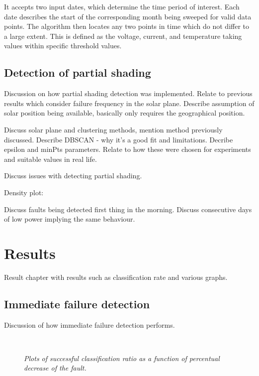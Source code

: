 It accepts two input dates, which determine the time period of interest.
Each date describes the start of the corresponding month being sweeped for valid data points.
The algorithm then locates any two points in time which do not differ to a large extent.
This is defined as the voltage, current, and temperature taking values within specific threshold values.

\section{Detection of partial shading}
Discussion on how partial shading detection was implemented.
Relate to previous results which consider failure frequency in the solar plane.
Describe assumption of solar position being available, basically only requires the geographical position.

Discuss solar plane and clustering methods, mention method previously discussed.
Describe DBSCAN - why it's a good fit and limitations.
Decribe epsilon and minPts parameters.
Relate to how these were chosen for experiments and suitable values in real life.

Discuss issues with detecting partial shading.

Density plot:

Discuss faults being detected first thing in the morning.
Discuss consecutive days of low power implying the same behaviour.

\chapter{Results}
Result chapter with results such as classification rate and various graphs.

\section{Immediate failure detection}
Discussion of how immediate failure detection performs.

\begin{figure}[here]
\centering
{}
~
\caption[Immediate failure detection performance]{\emph{
   Plots of successful classification ratio as a function of percentual decrease of the fault.
}}
\end{figure}

